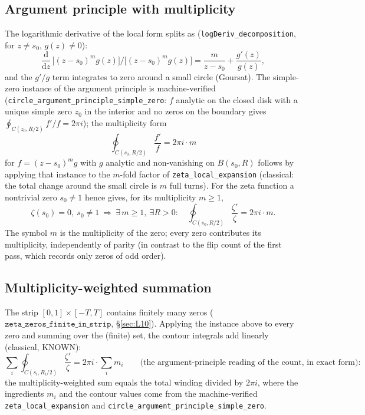 \documentclass{article}
\newcommand{\zt}{\zeta}
\begin{document}
\subsection{Argument principle with multiplicity}
\label{sec:partII:arg}

The logarithmic derivative of the local form splits as
(\texttt{logDeriv\_decomposition}, for $z\ne s_0$, $g(z)\ne 0$):
\begin{equation}
\frac{\mathrm{d}}{\mathrm{d}z}\,\bigl[(z-s_0)^m g(z)\bigr] \Big/ \bigl[(z-s_0)^m g(z)\bigr]
=\frac{m}{z-s_0}+\frac{g'(z)}{g(z)},
\end{equation}
and the $g'\!/g$ term integrates to zero around a small circle (Goursat).
The simple-zero instance of the argument principle is machine-verified
(\texttt{circle\_argument\_principle\_simple\_zero}: $f$ analytic on the
closed disk with a unique simple zero $z_0$ in the interior and no zeros
on the boundary gives $\oint_{C(z_0,R/2)}f'/f=2\pi i$); the
multiplicity form
\begin{equation}
\oint_{C(s_0,R/2)}\frac{f'}f=2\pi i\cdot m
\end{equation}
for $f=(z-s_0)^m g$ with $g$ analytic and non-vanishing on $B(s_0,R)$
follows by applying that instance to the $m$-fold factor of
\texttt{zeta\_local\_expansion} (classical: the total change around the
small circle is $m$ full turns). For
the zeta function a nontrivial zero $s_0\ne 1$ hence gives, for its
multiplicity $m\ge1$,
\begin{equation}
\zt(s_0)=0,\ s_0\ne 1\ \Longrightarrow\ \exists\, m\ge 1,\ \exists R>0:
\quad \oint_{C(s_0,R/2)}\frac{\zt'}\zt=2\pi i\cdot m .
\end{equation}
The symbol $m$ is the multiplicity of the zero; every zero
contributes its multiplicity, independently of parity (in contrast to the
flip count of the first pass, which records only zeros of odd order).

\subsection{Multiplicity-weighted summation}
\label{sec:partII:sum}

The strip $[0,1]\times[-T,T]$ contains finitely many zeros
($\texttt{zeta\_zeros\_finite\_in\_strip}$, \S\ref{sec:L10}). Applying the
instance above
to every zero and summing over the (finite) set, the contour integrals
add linearly (classical, KNOWN):
\begin{equation}
\sum_i\oint_{C(s_i,R_i/2)}\frac{\zt'}\zt
=2\pi i\cdot\sum_i m_i\qquad
\text{(the argument-principle reading of the count, in exact form)}:
\end{equation}
the multiplicity-weighted sum equals the total winding divided by $2\pi i$,
where the ingredients $m_i$ and the contour values come from the
machine-verified \texttt{zeta\_local\_expansion} and
\texttt{circle\_argument\_principle\_simple\_zero}.
\end{document}
